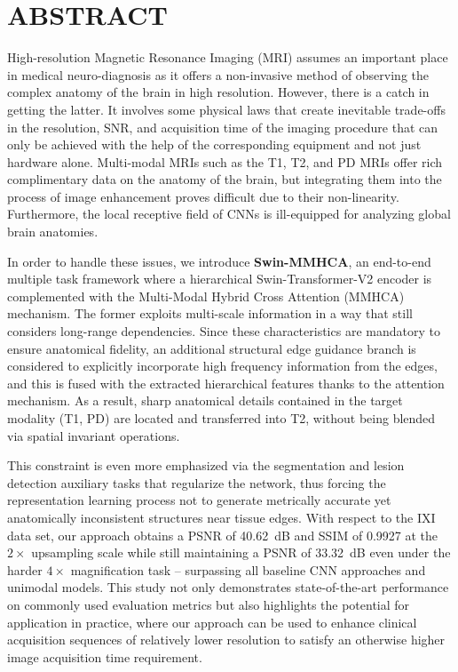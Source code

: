 \chapter*{ABSTRACT}
High-resolution Magnetic Resonance Imaging (MRI) assumes an important place in medical neuro-diagnosis as it offers a non-invasive method of observing the complex anatomy of the brain in high resolution. However, there is a catch in getting the latter. It involves some physical laws that create inevitable trade-offs in the resolution, SNR, and acquisition time of the imaging procedure that can only be achieved with the help of the corresponding equipment and not just hardware alone. Multi-modal MRIs such as the T1, T2, and PD MRIs offer rich complimentary data on the anatomy of the brain, but integrating them into the process of image enhancement proves difficult due to their non-linearity. Furthermore, the local receptive field of CNNs is ill-equipped for analyzing global brain anatomies.

In order to handle these issues, we introduce \textbf{Swin-MMHCA}, an end-to-end multiple task framework where a hierarchical Swin-Transformer-V2 encoder is complemented with the Multi-Modal Hybrid Cross Attention (MMHCA) mechanism. The former exploits multi-scale information in a way that still considers long-range dependencies. Since these characteristics are mandatory to ensure anatomical fidelity, an additional structural edge guidance branch is considered to explicitly incorporate high frequency information from the edges, and this is fused with the extracted hierarchical features thanks to the attention mechanism. As a result, sharp anatomical details contained in the target modality (T1, PD) are located and transferred into T2, without being blended via spatial invariant operations.

This constraint is even more emphasized via the segmentation and lesion detection auxiliary tasks that regularize the network, thus forcing the representation learning process not to generate metrically accurate yet anatomically inconsistent structures near tissue edges.
With respect to the IXI data set, our approach obtains a PSNR of 40.62~dB and SSIM of 0.9927 at the $2\times$ upsampling scale while still maintaining a PSNR of 33.32~dB even under the harder $4\times$ magnification task – surpassing all baseline CNN approaches and unimodal models. This study not only demonstrates state-of-the-art performance on commonly used evaluation metrics but also highlights the potential for application in practice, where our approach can be used to enhance clinical acquisition sequences of relatively lower resolution to satisfy an otherwise higher image acquisition time requirement.